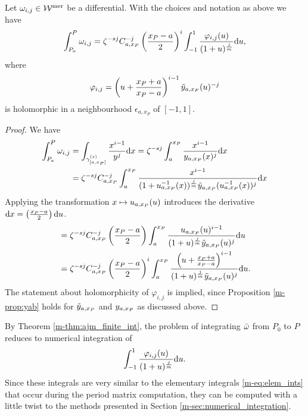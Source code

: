 \documentclass[main.tex]{subfiles}
\begin{document}
  \begin{thm}\label{thm:ajm_finite_int}
  Let $\omega_{i,j} \in \mathcal{W}^{\text{mer}}$ be a differential. With the choices and notation as above we have
 \begin{equation}\label{eq:aj_int}
       \int_{P_a}^P \omega_{i,j} = \zeta^{-sj} C_{a,x_P}^{-j} \left(\frac{x_P-a}{2}\right)^i \int_{-1}^1 \frac{\varphi_{i,j}(u)}{(1+u)^{\frac{j}{m}}}  \mathrm d u,
  \end{equation}
   where
   \begin{equation}
    \varphi_{i,j}  = \left(u+\frac{x_P+a}{x_P-a}\right)^{i-1} \tilde{y}_{a,x_P}(u)^{-j}
   \end{equation}
   is holomorphic in a neighbourhood $\epsilon_{a,x_P}$ of $[-1,1]$.
  \end{thm}
  \begin{proof}
    We have
    \begin{align}
     \int_{P_a}^P \omega_{i,j}  & =  \int_{\gamma^{(s)}_{[a,x_P]}} \frac{x^{i-1}}{y^j}  \mathrm d x  =  \zeta^{-sj} \int_a^{x_P} \frac{x^{i-1}}{y_{a,x_P}(x)^j}  \mathrm d x \\  & = 
     \zeta^{-sj} C_{a,x_P}^{-j}  \int_a^{x_P} \frac{x^{i-1}}{(1+u_{a,x_P}^{-1}(x))^{\frac{j}{m}}\tilde{y}_{a,x_P}(u_{a,x_P}^{-1}(x))^j}  \mathrm d x
  \end{align}
   Applying the transformation $x \mapsto u_{a,x_P}(u)$ introduces the derivative $\mathrm d x = \left(\frac{x_P-a}{2}\right) \mathrm d u$.
  \begin{align}
   & =  \zeta^{-sj} C_{a,x_P}^{-j} \left(\frac{x_P-a}{2}\right) \int_a^{x_P} \frac{u_{a,x_P}(u)^{i-1}}{(1+u)^{\frac{j}{m}}\tilde{y}_{a,x_P}(u)^j}  \mathrm d u \\ & =
   \zeta^{-sj} C_{a,x_P}^{-j} \left(\frac{x_P-a}{2}\right)^i \int_a^{x_P} \frac{\left(u + \frac{x_P+a}{x_P-a}\right)^{i-1}}{(1+u)^{\frac{j}{m}}\tilde{y}_{a,x_P}(u)^j}  \mathrm d u.
  \end{align}
  The statement about holomorphicity of $\varphi_{i,j}$ is implied, since Proposition \ref{m-prop:yab} holds for $\tilde{y}_{a,x_P}$ and $y_{a,x_P}$ as discussed above.
  \end{proof}

  \begin{rmk}\label{rmk:ajm_finite_int}
   By Theorem \ref{m-thm:ajm_finite_int}, the problem of integrating $\bar{\omega}$ from $P_0$ to $P$ reduces to numerical integration of
    \begin{equation}
       \int_{-1}^1 \frac{\varphi_{i,j}(u)}{(1+u)^{\frac{j}{m}}}  \mathrm d u.
   \end{equation}
   Since these integrals are very similar to the elementary integrals \eqref{m-eq:elem_ints} that occur during the period matrix computation, they can be computed with a little twist to
   the methods presented in Section \ref{m-sec:numerical_integration}.
   \end{rmk}
\end{document}
